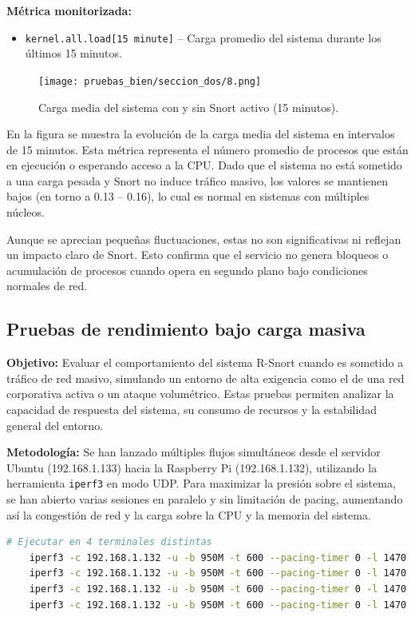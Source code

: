 \documentclass[11pt,a4paper,twoside]{report}
\begin{document}
\textbf{Métrica monitorizada:}
\begin{itemize}
	\item \texttt{kernel.all.load[15 minute]} – Carga promedio del sistema durante los últimos 15 minutos.
\end{itemize}

\begin{figure}[H]
	\centering
	\texttt{[image: pruebas\_bien/seccion\_dos/8.png]}
	\caption{Carga media del sistema con y sin Snort activo (15 minutos).}
\end{figure}

En la figura se muestra la evolución de la carga media del sistema en intervalos de 15 minutos. Esta métrica representa el número promedio de procesos que están en ejecución o esperando acceso a la CPU. Dado que el sistema no está sometido a una carga pesada y Snort no induce tráfico masivo, los valores se mantienen bajos (en torno a 0.13 – 0.16), lo cual es normal en sistemas con múltiples núcleos.\newline

Aunque se aprecian pequeñas fluctuaciones, estas no son significativas ni reflejan un impacto claro de Snort. Esto confirma que el servicio no genera bloqueos o acumulación de procesos cuando opera en segundo plano bajo condiciones normales de red.

\subsection{Pruebas de rendimiento bajo carga masiva}

\textbf{Objetivo:}  
Evaluar el comportamiento del sistema R-Snort cuando es sometido a tráfico de red masivo, simulando un entorno de alta exigencia como el de una red corporativa activa o un ataque volumétrico. Estas pruebas permiten analizar la capacidad de respuesta del sistema, su consumo de recursos y la estabilidad general del entorno.\newline

\textbf{Metodología:}  
Se han lanzado múltiples flujos simultáneos desde el servidor Ubuntu (192.168.1.133) hacia la Raspberry Pi (192.168.1.132), utilizando la herramienta \texttt{iperf3} en modo UDP. Para maximizar la presión sobre el sistema, se han abierto varias sesiones en paralelo y sin limitación de pacing, aumentando así la congestión de red y la carga sobre la CPU y la memoria del sistema.

\begin{lstlisting}[language=bash,caption={Simulación de tráfico masivo desde Ubuntu Server hacia la Raspberry Pi},label={lst:trafico-masivo}]
	# Ejecutar en 4 terminales distintas
	iperf3 -c 192.168.1.132 -u -b 950M -t 600 --pacing-timer 0 -l 1470 -p 5201
	iperf3 -c 192.168.1.132 -u -b 950M -t 600 --pacing-timer 0 -l 1470 -p 5202
	iperf3 -c 192.168.1.132 -u -b 950M -t 600 --pacing-timer 0 -l 1470 -p 5203
	iperf3 -c 192.168.1.132 -u -b 950M -t 600 --pacing-timer 0 -l 1470 -p 5204
\end{lstlisting}
\end{document}
